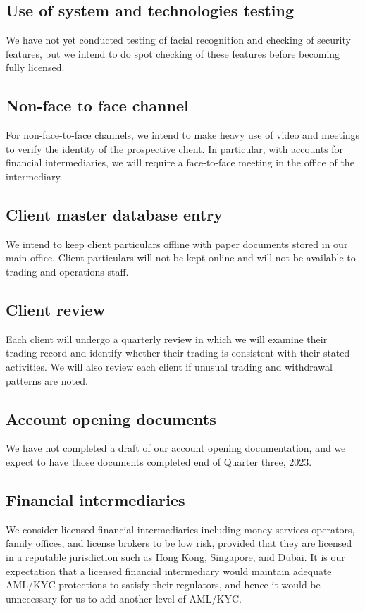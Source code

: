 \subsection{Use of system and technologies testing}
We have not yet conducted testing of facial recognition and checking
of security features, but we intend to do spot checking of these
features before becoming fully licensed.

\subsection{Non-face to face channel}
For non-face-to-face channels, we intend to make heavy use of video and
meetings to verify the identity of the
prospective client.  In particular, with accounts for financial
intermediaries, we will require a face-to-face meeting in the office of
the intermediary.

\subsection{Client master database entry}
We intend to keep client particulars offline with paper documents
stored in our main office.  Client particulars will not be kept online
and will not be available to trading and operations staff.

\subsection{Client review}
Each client will undergo a quarterly review in which we will examine
their trading record and identify whether their trading is
consistent with their stated activities.  We will also review each
client if unusual trading and withdrawal patterns are noted.

\subsection{Account opening documents}
We have not completed a draft of our account opening documentation, and
we expect to have those documents completed end of Quarter three, 2023.

\subsection{Financial intermediaries}
We consider licensed financial intermediaries including money services
operators, family offices, and license brokers to be low risk,
provided that they are licensed in a reputable jurisdiction such as
Hong Kong, Singapore, and Dubai.  It is our expectation that a
licensed financial intermediary would maintain adequate AML/KYC
protections to satisfy their regulators, and hence it would be
unnecessary for us to add another level of AML/KYC.

